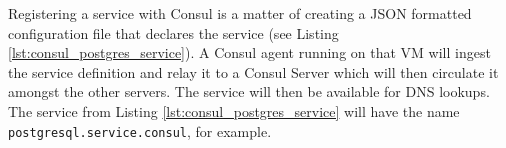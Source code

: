 Registering a service with Consul is a matter of creating a JSON formatted configuration file that declares the service (see Listing \ref{lst:consul_postgres_service}). A Consul agent running on that VM will ingest the service definition and relay it to a Consul Server which will then circulate it amongst the other servers. The service will then be available for DNS lookups. The service from Listing \ref{lst:consul_postgres_service} will have the name \texttt{postgresql.service.consul}, for example.